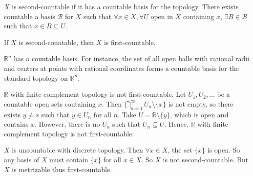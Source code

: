 \documentclass[main.tex]{subfiles}
\begin{document}
\begin{definition}
    $X$ is second-countable if it has a countable basis for the topology. There exists countable a basis $\mathcal{B}$ for $X$ such that $\forall x\in X, \forall U$ open in $X$ containing $x$, $\exists B \in \mathcal{B}$ such that $x \in B \subseteq U$. 
\end{definition}

\begin{property}
    If $X$ is second-countable, then $X$ is first-countable.
\end{property}

\begin{example}
    $\mathbb{R}^n$ has a countable basis. For instance, the set of all open balls with rational radii and centers at points with rational coordinates forms a countable basis for the standard topology on $\mathbb{R}^n$. 
\end{example}

\begin{example}
    $\mathbb{R}$ with finite complement topology is not first-countable. Let $U_1, U_2, \ldots$ be a countable open sets containing $x$. Then $\bigcap_{n=1}^{\infty} U_n \setminus \{x\}$ is not empty, so there exists $y \neq x$ such that $y \in U_n$ for all $n$. Take $U = \mathbb{R} \setminus \{y\}$, which is open and contains $x$. However, there is no $U_n$ such that $U_n \subseteq U$. Hence, $\mathbb{R}$ with finite complement topology is not first-countable.
\end{example}

\begin{example}
    $X$ is uncountable with discrete topology. Then $\forall x\in X$, the set $\{x\} $ is open. So any basis of $X$ must contain $\{x\}$ for all $x\in X$. So $X$ is not second-countable. But $X$ is metrizable thus first-countable. 
\end{example}
\end{document}
